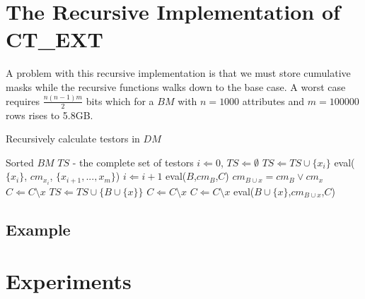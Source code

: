 \documentclass[citeauthoryear]{llncs}
\begin{document}
\section{The Recursive Implementation of CT\_EXT}
%
	A problem with this recursive implementation is that we must store cumulative masks while the recursive
	functions walks down to the base case. A worst case requires $\frac{n(n-1)m}{2}$ bits which for a $BM$
	with $n=1000$ attributes and $m=100000$ rows rises to 5.8GB. 
	
	
	\renewcommand{\algorithmicrequire}{\textbf{Input:}}
	\renewcommand{\algorithmicensure}{\textbf{Output:}}
	\begin{algorithm}
	\caption{Recursively calculate testors in $DM$}
	\label{alg1}
	\begin{multicols}{2}
	\begin{algorithmic}
	  \REQUIRE Sorted $BM$
	  \ENSURE $TS$ - the complete set of testors
	  \STATE $i \Leftarrow 0$, $TS \Leftarrow \emptyset$
	  		\STATE $TS \Leftarrow TS\cup \lbrace x_i \rbrace$
	  	\ELSE
	  		\STATE eval($\lbrace x_i \rbrace$, $cm_{x_i}$, $\lbrace x_{i+1},..., x_m\rbrace$)
	  	\ENDIF
	  	\STATE $i \Leftarrow i+1$
	  \ENDWHILE
	  \STATE \STATE \STATE \STATE \STATE 
	  \STATE eval($B$,$cm_B$,$C$)
	  	\STATE $cm_{B\cup x}=cm_B \vee cm_x$
	  			\STATE $C \Leftarrow C\setminus x$	 
	  			\STATE $TS \Leftarrow TS\cup\lbrace B\cup \lbrace x\rbrace \rbrace$
	  		\ENDIF
	  	\ELSE
	  		\STATE $C \Leftarrow C\setminus x$
	  	\ENDIF
	  \ENDFOR
	  	\STATE $C \Leftarrow C\setminus x$
	  	\STATE eval($B\cup \lbrace x\rbrace$,$cm_{B\cup x}$,$C$)
	  \ENDFOR
	\end{algorithmic}
	\end{multicols}
	\end{algorithm}
	
		
\subsection{Example}
%
\section{Experiments}
%
%
\end{document}

